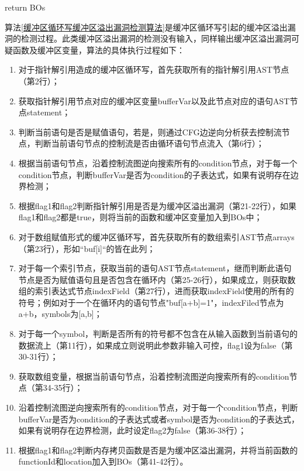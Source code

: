 {\begin{algorithm}
\begin{algorithmic}[1]
	\STATE return BOs	
	\end{algorithmic}
\end{algorithm}

算法\ref{缓冲区循环写缓冲区溢出漏洞检测算法}是缓冲区循环写引起的缓冲区溢出漏洞的检测过程。此类缓冲区溢出漏洞的检测没有输入，同样输出缓冲区溢出漏洞可疑函数及缓冲区变量，算法的具体执行过程如下：
\begin{enumerate}[(1)]
\item 对于指针解引用造成的缓冲区循环写，首先获取所有的指针解引用AST节点（第2行）；
\item 获取指针解引用节点对应的缓冲区变量bufferVar以及此节点对应的语句AST节点statement；
\item 判断当前语句是否是赋值语句，若是，则通过CFG边逆向分析获去控制流节点，判断当前语句节点的控制流是否由循环语句节点流入（第6行）；
\item 根据当前语句节点，沿着控制流图逆向搜索所有的condition节点，对于每一个condition节点，判断bufferVar是否为condition的子表达式，如果有说明存在边界检测；
\item 根据flag1和flag2判断指针解引用是否是为缓冲区溢出漏洞（第21-22行），如果flag1和flag2都是true，则将当前的函数和缓冲区变量加入到BOs中；
\item 对于数组赋值形式的缓冲区循环写，首先获取所有的数组索引AST节点arrays（第23行），形如“buf[i]“的皆在此列；
\item 对于每一个索引节点，获取当前的语句AST节点statement，继而判断此语句节点是否为赋值语句且是否包含在循环内（第25-26行），如果成立，则获取数组的索引表达式节点indexField（第27行），进而获取indexField使用的所有的符号；例如对于一个在循环内的语句节点"buf[a+b]=1"，indexFiled节点为a+b，symbols为[a,b]；
\item 对于每一个symbol，判断是否所有的符号都不包含在从输入函数到当前语句的数据流上（第11行），如果成立则说明此参数非输入可控，flag1设为false（第30-31行）；
\item 获取数组变量，根据当前语句节点，沿着控制流图逆向搜索所有的condition节点（第34-35行）；
\item 沿着控制流图逆向搜索所有的condition节点，对于每一个condition节点，判断bufferVar是否为condition的子表达式或者symbol是否为condition的子表达式，如果有说明存在边界检测，此时设定flag2为false（第36-38行）；
\item 根据flag1和flag2判断内存拷贝函数是否是为缓冲区溢出漏洞，并将当前函数的functionId和location加入到BOs（第41-42行）。
\end{enumerate}

\begin{breakablealgorithm}
	\renewcommand{\algorithmicrequire}{\textbf{Input:}}
	\renewcommand{\algorithmicensure}{\textbf{Output:}}
	

\end{breakablealgorithm}}
